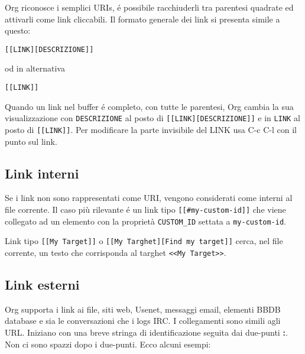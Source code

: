 \documentclass[11pt]{article}
\begin{document}
Org riconosce i semplici URIs, é possibile racchiuderli tra parentesi
quadrate ed attivarli come link cliccabili. Il formato generale dei
link si presenta simile a questo:

\begin{verbatim}
[[LINK][DESCRIZIONE]]
\end{verbatim}


od in alternativa

\begin{verbatim}
[[LINK]]
\end{verbatim}


Quando un link nel buffer é completo, con tutte le parentesi, Org
cambia la sua visualizzazione con \texttt{DESCRIZIONE} al posto di
\texttt{[[LINK][DESCRIZIONE]]} e in \texttt{LINK} al posto di \texttt{[[LINK]]}. Per
modificare la parte invisibile del LINK usa C-c C-l con il punto sul link.

\subsection*{Link interni}
\label{sec:org8b21239}
Se i link non sono rappresentati come URI, vengono considerati come
interni al file corrente. Il caso più rilevante é un link tipo
\texttt{[[\#my-custom-id]]} che viene collegato ad un elemento con la
proprietà \texttt{CUSTOM\_ID} settata a \texttt{my-custom-id}.

Link tipo \texttt{[[My Target]]} o \texttt{[[My Targhet][Find my target]]} cerca,
nel file corrente, un testo che corrisponda al targhet \texttt{<{}<{}My
Target>{}>{}}.

\subsection*{Link esterni}
\label{sec:org42fa705}
Org supporta i link ai file, siti web, Usenet, messaggi email, elementi
BBDB database e sia le conversazioni che i logs IRC. I collegamenti
sono simili agli URL. Iniziano con una breve stringa di
identificazione seguita dai due-punti \textbf{:}. Non ci sono spazzi dopo i
due-punti. Ecco alcuni esempi:
\end{document}
